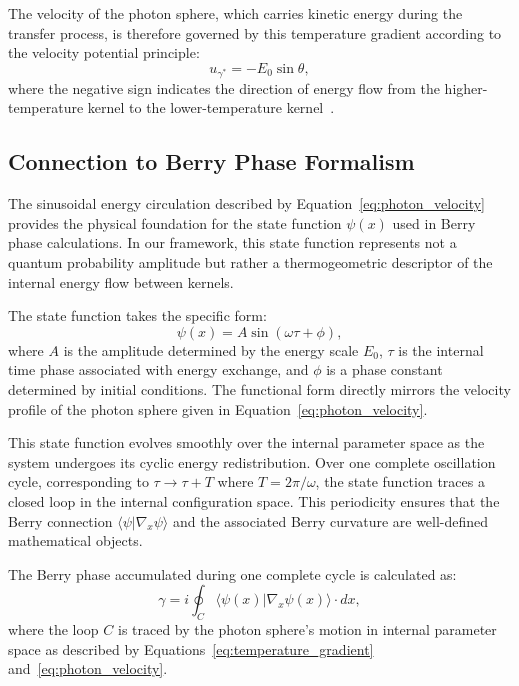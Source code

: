 \documentclass[%
 reprint,
 amsmath,amssymb,
 aps,
]{revtex4-1}
\numberwithin{equation}{section}%
\begin{document}
The velocity of the photon sphere, which carries kinetic energy during the transfer process, is therefore governed by this temperature gradient according to the velocity potential principle:
\begin{equation}
\boxed{u_{\gamma^*} = -E_0 \sin\theta}, \label{eq:photon_velocity}
\end{equation}
where the negative sign indicates the direction of energy flow from the higher-temperature kernel to the lower-temperature kernel~\cite{hanamura1811.0312}.

\subsection{Connection to Berry Phase Formalism} \label{subsec:berry_connection}

The sinusoidal energy circulation described by Equation~\eqref{eq:photon_velocity} provides the physical foundation for the state function $\psi(x)$ used in Berry phase calculations. In our framework, this state function represents not a quantum probability amplitude but rather a thermogeometric descriptor of the internal energy flow between kernels.

The state function takes the specific form:
\begin{equation}
\psi(x) = A \sin(\omega \tau + \phi), \label{eq:state_function}
\end{equation}
where $A$ is the amplitude determined by the energy scale $E_0$, $\tau$ is the internal time phase associated with energy exchange, and $\phi$ is a phase constant determined by initial conditions. The functional form directly mirrors the velocity profile of the photon sphere given in Equation~\eqref{eq:photon_velocity}.

This state function evolves smoothly over the internal parameter space as the system undergoes its cyclic energy redistribution. Over one complete oscillation cycle, corresponding to $\tau \rightarrow \tau + T$ where $T = 2\pi/\omega$, the state function traces a closed loop in the internal configuration space. This periodicity ensures that the Berry connection $\langle \psi | \nabla_x \psi \rangle$ and the associated Berry curvature are well-defined mathematical objects.

The Berry phase accumulated during one complete cycle is calculated as:
\begin{equation}
\gamma = i \oint_C \langle \psi(x) | \nabla_x \psi(x) \rangle \cdot dx, \label{eq:berry_phase_integral}
\end{equation}
where the loop $C$ is traced by the photon sphere's motion in internal parameter space as described by Equations~\eqref{eq:temperature_gradient} and~\eqref{eq:photon_velocity}.
\end{document}
